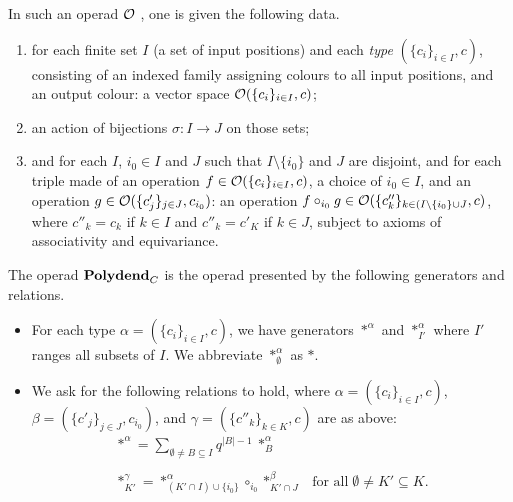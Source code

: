 \documentclass{article}
\theoremstyle{plain}
\theoremstyle{definition}
\newcommand{\inc}{\subseteq}
\newcommand{\set}[1]{\{#1\}}
\begin{document}
\smallskip
In such an operad ${\cal O}$ , one is given the following data.
\begin{enumerate}
\item  for each finite set $I$  (a set of input positions) and  each {\em type} $(\set{c_i}_{i\in I},c)$, consisting of  an indexed family assigning  colours to all input positions, and an output colour:
a vector space ${\cal O}(\set{c_i}_{i\in I},c)$;
\item an action of bijections $\sigma:I\rightarrow J$ on those sets;
\item and for each $I$, $i_0\in I$ and $J$ such that $I\setminus\set{i_0}$ and $J$ are disjoint, and for each triple made of an operation $f\in {\cal O}(\set{c_i}_{i\in I},c)$,  a choice of $i_0\in I$, and an operation
$g\in {\cal O}(\set{c'_j}_{j\in J},c_{i_0})$: an operation $f\circ_{i_0}  g\in {\cal O}(\set{c''_k}_{k\in (I\setminus\set{i_0}\cup J},c)$, where $c''_k=c_k$ if $k\in I$ and
$c''_k=c'_K$ if $k\in J$, subject to axioms of associativity and equivariance.
\end{enumerate}

The operad ${\bf Polydend}_C$ is the operad presented by the following generators and relations.
\begin{itemize}
\item
For each type  $\alpha = (\set{c_i}_{i\in I},c)$, we have generators $\ast^\alpha$ and
$\ast_{I'}^\alpha$ where $I'$ ranges all  subsets of $I$.  
We abbreviate $\ast_\emptyset^\alpha$ as $\ast$.
\item 
We ask for the following relations to hold, where $\alpha = (\set{c_i}_{i\in I},c)$, 
$\beta=(\set{c'_j}_{j\in J},c_{i_0})$, and $\gamma=(\set{c''_k}_{k\in K},c)$  are as above:
%
$$\begin{array}{ll}
\ast^\alpha =  \sum_{\emptyset\neq B \subseteq I} q^{|B|-1}\:\ast_{B}^\alpha & \\\\
\ast^\gamma_{K'} = \ast^\alpha_{(K'\cap I)\cup\set{i_0}}\circ_{i_0}\ast^\beta_{K'\cap J} & \textrm{for all}\; \emptyset \neq K'\inc K.
\end{array}$$
\end{itemize}
\end{document}
